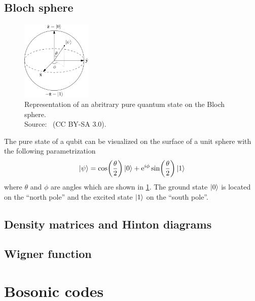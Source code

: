 \documentclass[main.tex]{subfiles}
\begin{document}
\subsection{Bloch sphere}
\begin{figure}[t]
    \centering
    \includegraphics[width=0.3\textwidth]{figs/bloch_sphere.png}
    \caption{Representation of an abritrary pure quantum state on the Bloch sphere.
    \\ Source:~\cite{noauthor_file:bloch_nodate} (CC BY-SA 3.0).
    }%
    \label{fig:bloch_sphere}
\end{figure}

The pure state of a qubit can be visualized on the surface of a unit sphere with the following parametrization
\begin{equation}
    \ket{\psi} = \cos(\frac{\theta}{2})\ket{0} + \mathrm{e}^{i\phi}\sin(\frac{\theta}{2})\ket{1}
\end{equation}
where \( \theta \) and \( \phi \) are angles which are shown in \cref{fig:bloch_sphere}.
The ground state \(\ket{0}\) is located on the ``north pole'' and the excited state \(\ket{1}\) on the ``south pole''.


\subsection{Density matrices and Hinton diagrams}


\subsection{Wigner function}

\section{Bosonic codes}
\end{document}
